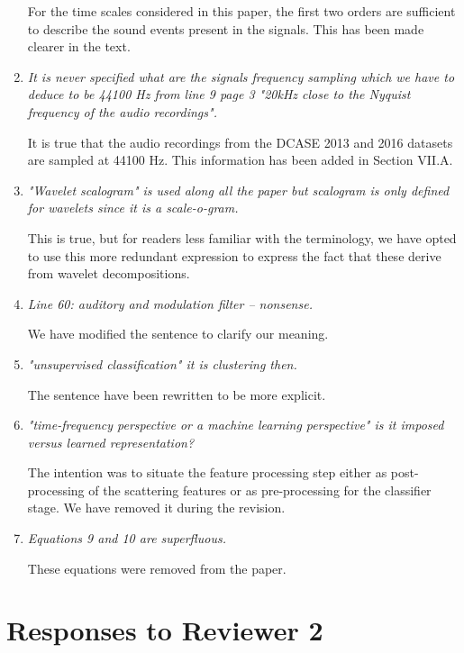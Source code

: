 \documentclass[10pt]{article}
\begin{document}
\begin{enumerate}
For the time scales considered in this paper, the first two orders are sufficient to describe the sound events present in the signals. This has been made clearer in the text.

\item \emph{It is never specified what are the signals frequency sampling which we have to deduce to be 44100 Hz from line 9 page 3 "20kHz close to the Nyquist frequency of the audio recordings".}

It is true that the audio recordings from the DCASE 2013 and 2016 datasets are sampled at 44100 Hz. This information has been added in Section VII.A.

\item \emph{"Wavelet scalogram" is used along all the paper but scalogram is only defined for wavelets since 
it is a scale-o-gram.}

This is true, but for readers less familiar with the terminology, we have opted to use this more redundant expression to express the fact that these derive from wavelet decompositions.

\item \emph{Line 60: auditory and modulation filter – nonsense.}

We have modified the sentence to clarify our meaning.

\item \emph{"unsupervised classification" it is clustering then.}

The sentence have been rewritten to be more explicit.

\item \emph{"time-frequency perspective or a machine learning perspective" is it imposed versus learned representation? }

The intention was to situate the feature processing step either as post-processing of the scattering features or as pre-processing for the classifier stage. We have removed it during the revision.

\item \emph{Equations 9 and 10 are superfluous.}

These equations were removed from the paper.

\end{enumerate}

\section{Responses to Reviewer 2}
\end{document}
